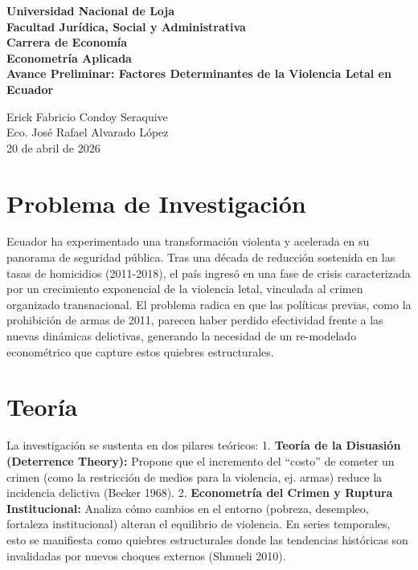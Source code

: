 \documentclass[12pt,spanish]{article}
\begin{document}
\begin{center}
    {\bfseries \Large Universidad Nacional de Loja}\\[0.3cm]
    {\bfseries \large Facultad Jurídica, Social y
Administrativa}\\[0.2cm]
    {\bfseries Carrera de Economía}\\[1.5cm]
    
    {\bfseries \large Econometría Aplicada}\\[1cm]
    
    {\bfseries \Large Avance Preliminar: Factores Determinantes de la
Violencia Letal en Ecuador}\\[1.5cm]
\end{center}

 Erick Fabricio Condoy Seraquive \\
 Eco. José Rafael Alvarado López \\
 20 de abril de 2026 \\

\vspace{1cm}

\doublespacing
\setlength{\parindent}{1.27cm}

\section{Problema de Investigación}\label{problema-de-investigaciuxf3n}

Ecuador ha experimentado una transformación violenta y acelerada en su
panorama de seguridad pública. Tras una década de reducción sostenida en
las tasas de homicidios (2011-2018), el país ingresó en una fase de
crisis caracterizada por un crecimiento exponencial de la violencia
letal, vinculada al crimen organizado transnacional. El problema radica
en que las políticas previas, como la prohibición de armas de 2011,
parecen haber perdido efectividad frente a las nuevas dinámicas
delictivas, generando la necesidad de un re-modelado econométrico que
capture estos quiebres estructurales.

\section{Teoría}\label{teoruxeda}

La investigación se sustenta en dos pilares teóricos: 1. \textbf{Teoría
de la Disuasión (Deterrence Theory):} Propone que el incremento del
``costo'' de cometer un crimen (como la restricción de medios para la
violencia, ej. armas) reduce la incidencia delictiva (Becker 1968). 2.
\textbf{Econometría del Crimen y Ruptura Institucional:} Analiza cómo
cambios en el entorno (pobreza, desempleo, fortaleza institucional)
alteran el equilibrio de violencia. En series temporales, esto se
manifiesta como quiebres estructurales donde las tendencias históricas
son invalidadas por nuevos choques externos (Shmueli 2010).
\end{document}
